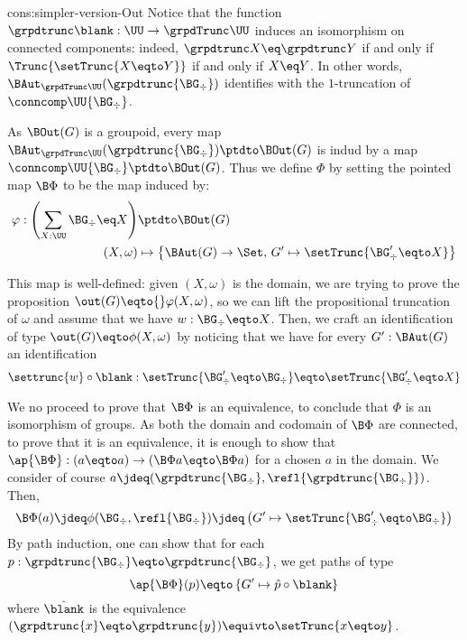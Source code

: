 \begin{implementation}{cons:simpler-version-Out}
  Notice that the function $\grpdtrunc \blank : \UU \to \grpdTrunc\UU$ induces
  an isomorphism on connected components: indeed,
  $\grpdtrunc X \eq \grpdtrunc Y$ if and only if $\Trunc{\setTrunc{X \eqto Y}}$
  if and only if $X \eq Y$. In other words,
  $\BAut_{\grpdTrunc\UU}(\grpdtrunc{\BG_\div})$ identifies with the
  $1$-truncation of $\conncomp\UU{\BG_\div}$.

  As $\BOut(G)$ is a groupoid, every map
  $\BAut_{\grpdTrunc\UU}(\grpdtrunc{\BG_\div}) \ptdto \BOut(G)$ is indud by a map
  $\conncomp\UU{\BG_\div} \ptdto \BOut(G)$. Thus we define $\Phi$ by setting the
  pointed map $\B\Phi$ to be the map induced by:
  \begin{align*}
    \varphi:
    \left(\sum_{X:\UU}\BG_\div \eq X\right) &\ptdto \BOut(G) \\
    (X,\omega) &\mapsto \left\{
      \BAut(G) \to \Set, \, G' \mapsto \setTrunc{\BG'_\div \eqto X}
      \right\}
  \end{align*}
  
  This map is well-defined: given $(X,\omega)$ is the domain, we are trying to
  prove the proposition $\out(G) \eqto{} \varphi(X,\omega)$, so we can lift the
  propositional truncation of $\omega$ and assume that we have
  $w:\BG_\div \eqto X$. Then, we craft an identification of type
  $\out(G) \eqto \phi(X,\omega)$ by noticing that we have for every
  $G':\BAut(G)$ an identification
  \begin{displaymath}
    \settrunc{w} \circ \blank : \setTrunc{\BG'_\div \eqto \BG_\div} \eqto \setTrunc{\BG'_\div \eqto X}
  \end{displaymath}
  
  We no proceed to prove that $\B\Phi$ is an equivalence, to conclude that
  $\Phi$ is an isomorphism of groups. As both the domain and codomain of
  $\B\Phi$ are connected, to prove that it is an equivalence, it is enough to
  show that $\ap {\B\Phi}: (a \eqto a) \to (\B\Phi a \eqto \B\Phi a)$ for a
  chosen $a$ in the domain. We consider of course
  $a \jdeq (\grpdtrunc{\BG_\div},\refl{\grpdtrunc{\BG_\div}})$. Then,
  \begin{displaymath}
    \B\Phi(a) \jdeq \phi(\BG_\div,\refl{\BG_\div}) \jdeq  \left(
      G' \mapsto \setTrunc{\BG'_\div \eqto \BG_\div}
    \right)
  \end{displaymath}
  By path induction, one can show that for each
  $p:\grpdtrunc{\BG_\div} \eqto \grpdtrunc{\BG_\div}$, we get paths of type
  \begin{displaymath}
    \ap{\B\Phi} (p) \eqto \left\{
      G' \mapsto \hat p \circ \blank
    \right\}
  \end{displaymath}
  where $\hat \blank$ is the equivalence
  $(\grpdtrunc{x} \eqto \grpdtrunc{y}) \equivto \setTrunc{x \eqto y}$.


\end{implementation}
